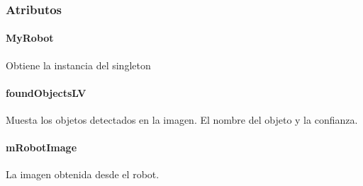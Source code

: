 \subsubsection{Atributos}
\label{\detokenize{dev_docs:id26}}

\paragraph{MyRobot}
\label{\detokenize{dev_docs:id27}}

\begin{fulllineitems}
\label{\detokenize{dev_docs:com.lar.cloudnao.ObjectDetectionActivity.MyRobot}}
Obtiene la instancia del singleton {\hyperref[\detokenize{dev_docs:com.lar.cloudnao.Robot}]{}}

\end{fulllineitems}



\paragraph{foundObjectsLV}
\label{\detokenize{dev_docs:foundobjectslv}}

\begin{fulllineitems}
\label{\detokenize{dev_docs:com.lar.cloudnao.ObjectDetectionActivity.foundObjectsLV}}
Muesta los objetos detectados en la imagen. El nombre del objeto y la confianza.

\end{fulllineitems}



\paragraph{mRobotImage}
\label{\detokenize{dev_docs:id28}}

\begin{fulllineitems}
\label{\detokenize{dev_docs:com.lar.cloudnao.ObjectDetectionActivity.mRobotImage}}
La imagen obtenida desde el robot.

\end{fulllineitems}



